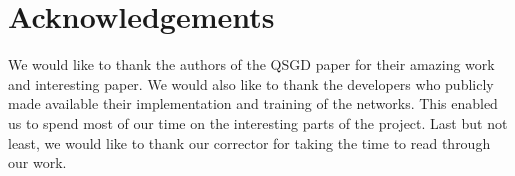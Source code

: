 \documentclass[10pt,conference,compsocconf]{IEEEtran}
\begin{document}
\section*{Acknowledgements}

We would like to thank the authors of the QSGD paper for their amazing work and interesting paper. We would also like to thank the developers who publicly made available their implementation and training of the networks. This enabled us to spend most of our time on the interesting parts of the project. Last but not least, we would like to thank our corrector for taking the time to read through our work.

\singlespacing
\singlespacing


\end{document}
